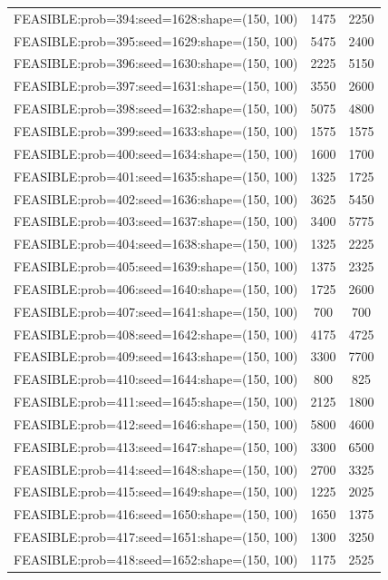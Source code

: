 \begin{longtable}{lcc}
FEASIBLE:prob=394:seed=1628:shape=(150, 100) &     1475 &  2250 \\
FEASIBLE:prob=395:seed=1629:shape=(150, 100) &     5475 &  2400 \\
FEASIBLE:prob=396:seed=1630:shape=(150, 100) &     2225 &  5150 \\
FEASIBLE:prob=397:seed=1631:shape=(150, 100) &     3550 &  2600 \\
FEASIBLE:prob=398:seed=1632:shape=(150, 100) &     5075 &  4800 \\
FEASIBLE:prob=399:seed=1633:shape=(150, 100) &     1575 &  1575 \\
FEASIBLE:prob=400:seed=1634:shape=(150, 100) &     1600 &  1700 \\
FEASIBLE:prob=401:seed=1635:shape=(150, 100) &     1325 &  1725 \\
FEASIBLE:prob=402:seed=1636:shape=(150, 100) &     3625 &  5450 \\
FEASIBLE:prob=403:seed=1637:shape=(150, 100) &     3400 &  5775 \\
FEASIBLE:prob=404:seed=1638:shape=(150, 100) &     1325 &  2225 \\
FEASIBLE:prob=405:seed=1639:shape=(150, 100) &     1375 &  2325 \\
FEASIBLE:prob=406:seed=1640:shape=(150, 100) &     1725 &  2600 \\
FEASIBLE:prob=407:seed=1641:shape=(150, 100) &      700 &   700 \\
FEASIBLE:prob=408:seed=1642:shape=(150, 100) &     4175 &  4725 \\
FEASIBLE:prob=409:seed=1643:shape=(150, 100) &     3300 &  7700 \\
FEASIBLE:prob=410:seed=1644:shape=(150, 100) &      800 &   825 \\
FEASIBLE:prob=411:seed=1645:shape=(150, 100) &     2125 &  1800 \\
FEASIBLE:prob=412:seed=1646:shape=(150, 100) &     5800 &  4600 \\
FEASIBLE:prob=413:seed=1647:shape=(150, 100) &     3300 &  6500 \\
FEASIBLE:prob=414:seed=1648:shape=(150, 100) &     2700 &  3325 \\
FEASIBLE:prob=415:seed=1649:shape=(150, 100) &     1225 &  2025 \\
FEASIBLE:prob=416:seed=1650:shape=(150, 100) &     1650 &  1375 \\
FEASIBLE:prob=417:seed=1651:shape=(150, 100) &     1300 &  3250 \\
FEASIBLE:prob=418:seed=1652:shape=(150, 100) &     1175 &  2525 \\

\end{longtable}

